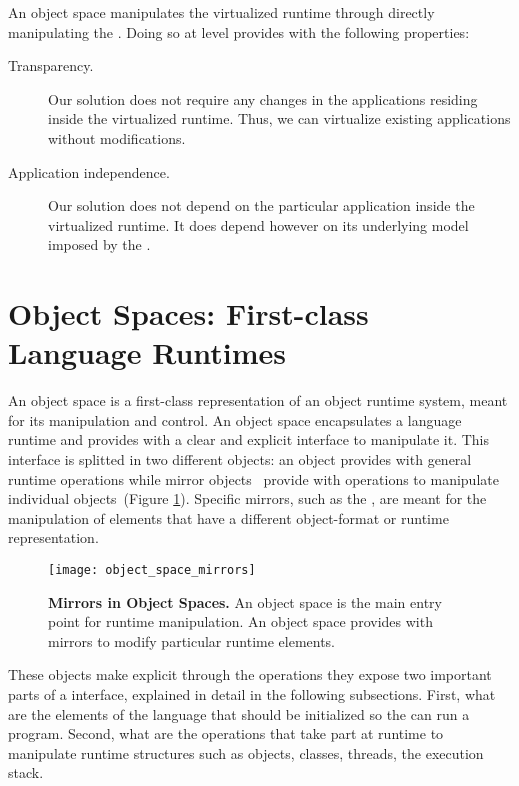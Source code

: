 An object space manipulates the virtualized runtime through directly manipulating the \VM. Doing so at \VM level provides \Vtt with the following properties:

\begin{description}
\item[Transparency.] Our solution does not require any changes in the applications residing inside the virtualized runtime. Thus, we can virtualize existing applications without modifications.
\item[Application independence.] Our solution does not depend on the particular application inside the virtualized runtime. It does depend however on its underlying model imposed by the \VM.
\end{description}

\section{Object Spaces: First-class Language Runtimes} \label{sec:object_space}

An object space is a first-class representation of an object runtime system, meant for its manipulation and control. An object space encapsulates a language runtime and provides with a clear and explicit interface to manipulate it. This interface is splitted in two different objects: an  object provides with general runtime operations while mirror objects~\cite{Brac04b} provide with operations to manipulate individual objects~(Figure \ref{fig:objectSpaceMirrors}). Specific mirrors, such as the , are meant for the manipulation of elements that have a different object-format or runtime representation.

\begin{figure}[htb]
\begin{center}
\texttt{[image: object\_space\_mirrors]}
\caption{\textbf{Mirrors in Object Spaces.} An object space is the main entry point for runtime manipulation. An object space provides with mirrors to modify particular runtime elements. \label{fig:objectSpaceMirrors}}
\end{center}
\end{figure}

These objects make explicit through the operations they expose two important parts of a \VM interface, explained in detail in the following subsections. First, what are the elements of the language that should be initialized so the \VM can run a program. Second, what are the operations that take part at runtime to manipulate runtime structures such as objects, classes, threads, the execution stack.

